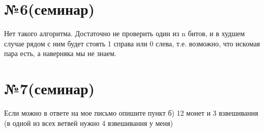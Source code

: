 \documentclass[a4paper,12pt]{article} %
\begin{document}
\section*{№6(семинар)}
Нет такого алгоритма. Достаточно не проверить один из n битов, и в худшем случае рядом с ним будет стоять 1 справа или 0 слева, т.е. возможно, что искомая пара есть, а наверняка мы не знаем.\\

\section*{№7(семинар)}
Если можно в ответе на мое письмо опишите пункт б)
12 монет  и 3 взвешивания (в одной из всех ветвей нужно 4 взвешивания у меня)
\end{document}
